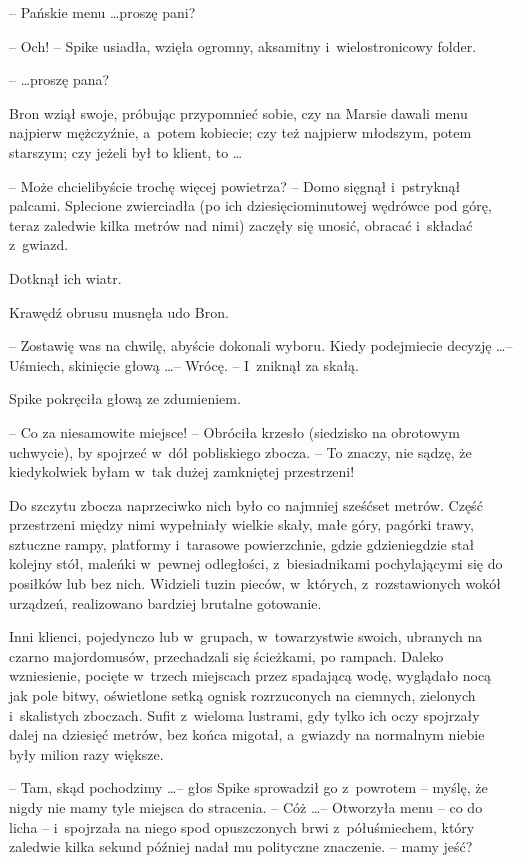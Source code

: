 \documentclass[oneside,polish,11pt,rmheadings]{mwbk}
\begin{document}
-- Pańskie menu \ldots  proszę pani? 

-- Och! -- Spike usiadła, wzięła ogromny, aksamitny i~wielostronicowy folder. 

--  \ldots  proszę pana? 

Bron wziął swoje, próbując przypomnieć sobie, czy na Marsie dawali menu najpierw mężczyźnie, a~potem kobiecie; czy też najpierw młodszym, potem starszym; czy jeżeli był to klient, to \ldots  

-- Może chcielibyście trochę więcej powietrza? -- Domo sięgnął i~pstryknął palcami. Splecione zwierciadła (po ich dziesięciominutowej wędrówce pod górę, teraz zaledwie kilka metrów nad nimi) zaczęły się unosić, obracać i~składać z~gwiazd.  

Dotknął ich wiatr. 

Krawędź obrusu musnęła udo Bron. 

-- Zostawię was na chwilę, abyście dokonali wyboru. Kiedy podejmiecie decyzję \ldots  -- Uśmiech, skinięcie głową \ldots  -- Wrócę. -- I~zniknął za skałą. 

Spike pokręciła głową ze zdumieniem. 

-- Co za niesamowite miejsce! -- Obróciła krzesło (siedzisko na obrotowym uchwycie), by spojrzeć w~dół pobliskiego zbocza. -- To znaczy, nie sądzę, że kiedykolwiek byłam w~tak dużej zamkniętej przestrzeni! 

Do szczytu zbocza naprzeciwko nich było co najmniej sześćset metrów. Część przestrzeni między nimi wypełniały wielkie skały, małe góry, pagórki trawy, sztuczne rampy, platformy i~tarasowe powierzchnie, gdzie gdzieniegdzie stał kolejny stół, maleńki w~pewnej odległości, z~biesiadnikami pochylającymi się do posiłków lub bez nich. Widzieli tuzin pieców, w~których, z~rozstawionych wokół urządzeń, realizowano bardziej brutalne gotowanie. 

Inni klienci, pojedynczo lub w~grupach, w~towarzystwie swoich, ubranych na czarno majordomusów, przechadzali się ścieżkami, po rampach. Daleko wzniesienie, pocięte w~trzech miejscach przez spadającą wodę, wyglądało nocą jak pole bitwy, oświetlone setką ognisk rozrzuconych na ciemnych, zielonych i~skalistych zboczach. Sufit z~wieloma lustrami, gdy tylko ich oczy spojrzały dalej na dziesięć metrów, bez końca migotał, a~gwiazdy na normalnym niebie były milion razy większe. 

-- Tam, skąd pochodzimy \ldots  -- głos Spike sprowadził go z~powrotem -- myślę, że nigdy nie mamy tyle miejsca do stracenia. -- Cóż \ldots  -- Otworzyła menu -- co do licha -- i~spojrzała na niego spod opuszczonych brwi z~półuśmiechem, który zaledwie kilka sekund później nadał mu polityczne znaczenie. -- mamy jeść? 
\end{document}
